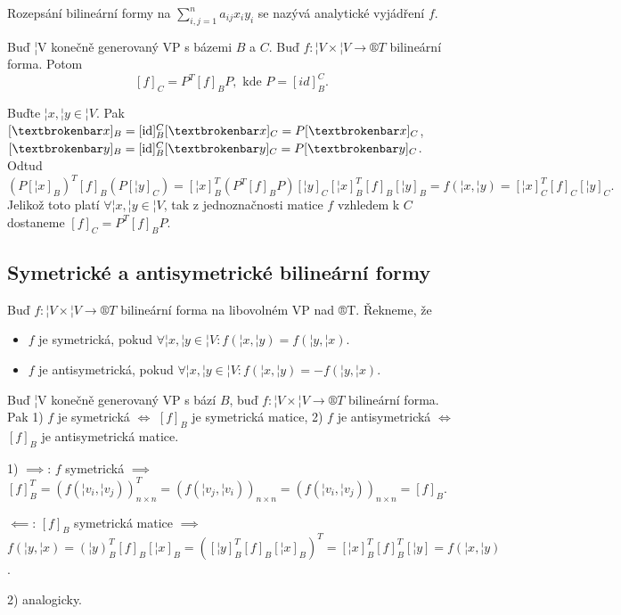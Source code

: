 \documentclass[12pt]{article}                   %
\begin{document}
        \begin{poznamka}[Terminologie]
            Rozepsání bilineární formy na $\sum_{i, j = 1}^n a_{ij}x_iy_i$ se nazývá analytické vyjádření $f$.
        \end{poznamka}

        \begin{tvrzeni}
            Buď ¦V konečně generovaný VP s bázemi $B$ a $C$. Buď $f: ¦V \times ¦V \rightarrow ®T$ bilineární forma. Potom
            $$ [f]_C = P^T [f]_B P, \text{ kde } P = [id]_B^C. $$ 

            \begin{dukazin}
                Buďte $¦x, ¦y \in ¦V$. Pak $[¦x]_B = [\id]^C_B [¦x]_C = P[¦x]_C$, $[¦y]_B = [\id]_B^C [¦y]_C = P[¦y]_C$. Odtud
                $$ (P[¦x]_B)^T [f]_B (P[¦y]_C) = [¦x]_B^T (P^T [f]_B P)[¦y]_C [¦x]_B^T [f]_B [¦y]_B = f(¦x, ¦y) = [¦x]_C^T[f]_C[¦y]_C. $$ 
                Jelikož toto platí $\forall ¦x, ¦y \in ¦V$, tak z jednoznačnosti matice $f$ vzhledem k $C$ dostaneme $[f]_C = P^T [f]_B P$.
            \end{dukazin}
        \end{tvrzeni}

    \subsection{Symetrické a antisymetrické bilineární formy}
        \begin{definice}
            Buď $f: ¦V \times ¦V \rightarrow ®T$ bilineární forma na libovolném VP nad ®T. Řekneme, že
            
            \begin{itemize}
                \item $f$ je symetrická, pokud $\forall ¦x, ¦y \in ¦V: f(¦x, ¦y) = f(¦y, ¦x)$.
                \item $f$ je antisymetrická, pokud $\forall ¦x, ¦y \in ¦V: f(¦x, ¦y) = -f(¦y, ¦x)$.
            \end{itemize}
        \end{definice}

        \begin{tvrzeni}
            Buď ¦V konečně generovaný VP s bází $B$, buď $f: ¦V \times ¦V \rightarrow ®T$ bilineární forma. Pak 1) $f$ je symetrická $\Leftrightarrow$ $[f]_B$ je symetrická matice, 2) $f$ je antisymetrická $\Leftrightarrow$ $[f]_B$ je antisymetrická matice.

            \begin{dukazin}
                1) $\implies$: $f$ symetrická $\implies$ $[f]_B^T = (f(¦v_i, ¦v_j))^T_{n\times n} = (f(¦v_j, ¦v_i))_{n \times n} = (f(¦v_i, ¦v_j))_{n \times n} = [f]_B$.

                $\impliedby$: $[f]_B$ symetrická matice $\implies$ $f(¦y, ¦x) = (¦y)^T_B [f]_B [¦x]_B = ([¦y]_B^T [f]_B [¦x]_B)^T = [¦x]_B^T [f]_B^T [¦y] = f(¦x, ¦y)$.

                2) analogicky.
            \end{dukazin}
        \end{tvrzeni}
\end{document}

